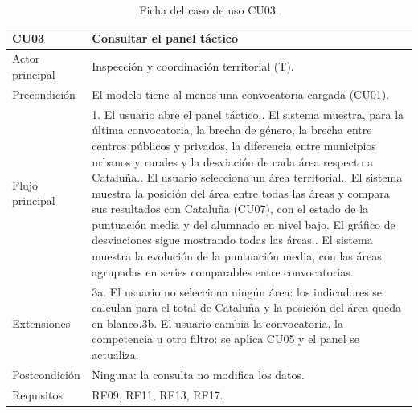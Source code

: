 \documentclass[12pt, a4paper, oneside]{report}
\begin{document}
\begin{table}[!tbp]
\centering
\small
{}\renewcommand{\arraystretch}{1.1}
\begin{tabularx}{\textwidth}{@{} >{\raggedright\arraybackslash}p{2.8cm} X @{}}
\toprule
\textbf{CU03} & \textbf{Consultar el panel táctico} \\ \midrule
Actor principal & Inspección y coordinación territorial (T). \\ \addlinespace
Precondición & El modelo tiene al menos una convocatoria cargada (CU01). \\ \addlinespace
Flujo principal & 1. El usuario abre el panel táctico.\newline 2. El sistema muestra, para la última convocatoria, la brecha de género, la brecha entre centros públicos y privados, la diferencia entre municipios urbanos y rurales y la desviación de cada área respecto a Cataluña.\newline 3. El usuario selecciona un área territorial.\newline 4. El sistema muestra la posición del área entre todas las áreas y compara sus resultados con Cataluña (CU07), con el estado de la puntuación media y del alumnado en nivel bajo. El gráfico de desviaciones sigue mostrando todas las áreas.\newline 5. El sistema muestra la evolución de la puntuación media, con las áreas agrupadas en series comparables entre convocatorias. \\ \addlinespace
Extensiones & 3a. El usuario no selecciona ningún área: los indicadores se calculan para el total de Cataluña y la posición del área queda en blanco.\newline 3b. El usuario cambia la convocatoria, la competencia u otro filtro: se aplica CU05 y el panel se actualiza. \\ \addlinespace
Postcondición & Ninguna: la consulta no modifica los datos. \\ \addlinespace
Requisitos & RF09, RF11, RF13, RF17. \\ \bottomrule
\end{tabularx}
\caption{Ficha del caso de uso CU03.}
\label{tab:cu03}
\end{table}
\end{document}
